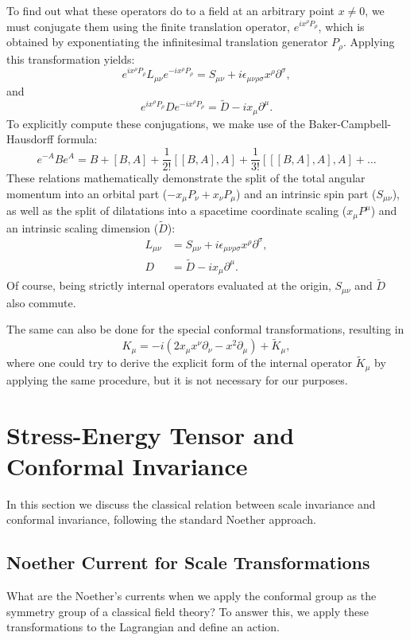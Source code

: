 To find out what these operators do to a field at an arbitrary point \(x \neq 0\), we must conjugate them using the finite translation operator, \(e^{ix^{\rho}P_{\rho}}\), which is obtained by exponentiating the infinitesimal translation generator \(P_{\rho}\). Applying this transformation yields:
\[
    e^{ix^{\rho}P_{\rho}}L_{\mu\nu}e^{-ix^{\rho}P_{\rho}}=S_{\mu\nu}+ i\epsilon_{\mu\nu\rho\sigma}x^{\rho}\partial^{\sigma},
\]
and
\[
    e^{ix^{\rho}P_{\rho}}De^{-ix^{\rho}P_{\rho}}=\tilde{D}-ix_{\mu}\partial^{\mu}.
\]
To explicitly compute these conjugations, we make use of the Baker-Campbell-Hausdorff formula:
\[
    e^{-A}Be^{A}=B+[B,A]+\frac{1}{2!}[[B,A],A]+\frac{1}{3!}[[[B,A],A],A]+\dots
\]
These relations mathematically demonstrate the split of the total angular momentum into an orbital part (\(-x_{\mu}P_{\nu}+x_{\nu}P_{\mu}\)) and an intrinsic spin part (\(S_{\mu\nu}\)), as well as the split of dilatations into a spacetime coordinate scaling (\(x_{\mu}P^{\mu}\)) and an intrinsic scaling dimension (\(\tilde{D}\)):
\[
    \begin{aligned}
        L_{\mu\nu} & = S_{\mu\nu} + i\epsilon_{\mu\nu\rho\sigma}x^{\rho}\partial^{\sigma}, \\
        D          & = \tilde{D} -ix_{\mu}\partial^{\mu}.
    \end{aligned}
\]
Of course, being strictly internal operators evaluated at the origin, \(S_{\mu\nu}\) and \(\tilde{D}\) also commute.

The same can also be done for the special conformal transformations, resulting in
\[
    K_{\mu}=-i(2x_{\mu}x^{\nu}\partial_{\nu}-x^{2}\partial_{\mu}) + \tilde{K}_\mu,
\]
where one could try to derive the explicit form of the internal operator \(\tilde{K}_\mu\) by applying the same procedure, but it is not necessary for our purposes.

\section{Stress-Energy Tensor and Conformal Invariance}

In this section we discuss the classical relation between scale invariance and conformal invariance, following the standard Noether approach.

\subsection{Noether Current for Scale Transformations}

What are the Noether's currents when we apply the conformal group as the symmetry group of a classical field theory? To answer this, we apply these transformations to the Lagrangian and define an action.

